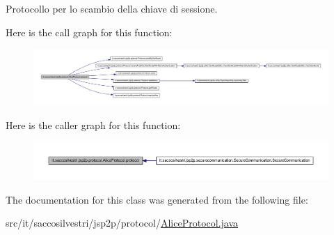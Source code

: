 \-Protocollo per lo scambio della chiave di sessione. 



\-Here is the call graph for this function\-:
\nopagebreak
\begin{figure}[H]
\begin{center}
\leavevmode
\includegraphics[width=350pt]{classit_1_1saccosilvestri_1_1jsp2p_1_1protocol_1_1_alice_protocol_a60cbfe1906bfbd7b95a7d21cec977843_cgraph}
\end{center}
\end{figure}




\-Here is the caller graph for this function\-:
\nopagebreak
\begin{figure}[H]
\begin{center}
\leavevmode
\includegraphics[width=350pt]{classit_1_1saccosilvestri_1_1jsp2p_1_1protocol_1_1_alice_protocol_a60cbfe1906bfbd7b95a7d21cec977843_icgraph}
\end{center}
\end{figure}




\-The documentation for this class was generated from the following file\-:\begin{DoxyCompactItemize}
\item 
src/it/saccosilvestri/jsp2p/protocol/\hyperlink{_alice_protocol_8java}{\-Alice\-Protocol.\-java}\end{DoxyCompactItemize}
